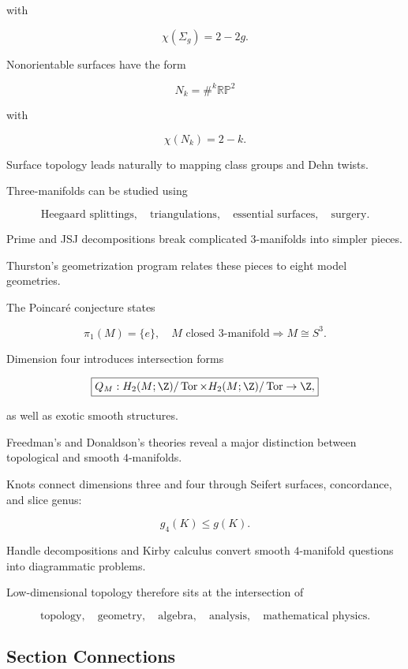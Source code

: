 with

\[
\boxed{
\chi(\Sigma_g)=2-2g.
}
\]

Nonorientable surfaces have the form

\[
\boxed{
N_k=\#^k\mathbb{RP}^2
}
\]

with

\[
\boxed{
\chi(N_k)=2-k.
}
\]

Surface topology leads naturally to mapping class groups and Dehn twists.

Three-manifolds can be studied using

\[
\boxed{
\text{Heegaard splittings},
\quad
\text{triangulations},
\quad
\text{essential surfaces},
\quad
\text{surgery}.
}
\]

Prime and JSJ decompositions break complicated \(3\)-manifolds into simpler
pieces.

Thurston's geometrization program relates these pieces to eight model
geometries.

The Poincar\'e conjecture states

\[
\boxed{
\pi_1(M)=\{e\},
\quad
M\text{ closed }3\text{-manifold}
\Longrightarrow
M\cong S^3.
}
\]

Dimension four introduces intersection forms

\[
\boxed{
Q_M:
H_2(M;\Z)/\operatorname{Tor}
\times
H_2(M;\Z)/\operatorname{Tor}
\to\Z,
}
\]

as well as exotic smooth structures.

Freedman's and Donaldson's theories reveal a major distinction between
topological and smooth \(4\)-manifolds.

Knots connect dimensions three and four through Seifert surfaces,
concordance, and slice genus:

\[
\boxed{
g_4(K)\leq g(K).
}
\]

Handle decompositions and Kirby calculus convert smooth \(4\)-manifold
questions into diagrammatic problems.

Low-dimensional topology therefore sits at the intersection of

\[
\boxed{
\text{topology},
\quad
\text{geometry},
\quad
\text{algebra},
\quad
\text{analysis},
\quad
\text{mathematical physics}.
}
\]

\subsection{Section Connections}
\label{subsec:low-dimensional-connections}

